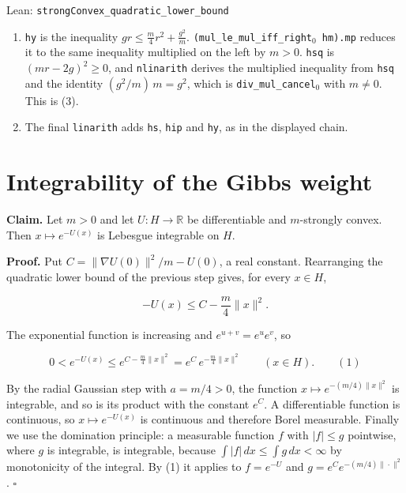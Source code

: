 \documentclass[11pt,a4paper]{article}
\begin{document}
\begin{leanbox}{Lean: \texttt{strongConvex\_\allowbreak{}quadratic\_\allowbreak{}lower\_\allowbreak{}bound}}
\begin{enumerate}
\item \texttt{hy} is the inequality \(gr\le\frac m4r^2+\frac{g^2}m\). \texttt{(mul\_\allowbreak{}le\_\allowbreak{}mul\_\allowbreak{}iff\_\allowbreak{}right\ensuremath{{}_{0}} hm).\allowbreak{}mp} reduces it to the same inequality multiplied on the left by \(m>0\). \texttt{hsq} is \((mr-2g)^2\ge0\), and \texttt{nlinarith} derives the multiplied inequality from \texttt{hsq} and the identity \((g^2/m)\,m=g^2\), which is \texttt{div\_\allowbreak{}mul\_\allowbreak{}cancel\ensuremath{{}_{0}}} with \(m\ne0\). This is (3).

\item The final \texttt{linarith} adds \texttt{hs}, \texttt{hip} and \texttt{hy}, as in the displayed chain.

\end{enumerate}
\end{leanbox}

\section{\texorpdfstring{Integrability of the Gibbs weight}{Integrability of the Gibbs weight}}


\textbf{Claim.} Let \(m>0\) and let \(U:H\to\mathbb R\) be differentiable and \(m\)-strongly convex. Then \(x\mapsto e^{-U(x)}\) is Lebesgue integrable on \(H\).




\textbf{Proof.} Put \(C=\|\nabla U(0)\|^2/m-U(0)\), a real constant. Rearranging the quadratic lower bound of the previous step gives, for every \(x\in H\),


\[-U(x)\le C-\frac m4\|x\|^2.\]


The exponential function is increasing and \(e^{u+v}=e^ue^v\), so


\[0<e^{-U(x)}\le e^{C-\frac m4\|x\|^2}=e^{C}\,e^{-\frac m4\|x\|^2}\qquad(x\in H).\qquad(1)\]


By the radial Gaussian step with \(a=m/4>0\), the function \(x\mapsto e^{-(m/4)\|x\|^2}\) is integrable, and so is its product with the constant \(e^{C}\). A differentiable function is continuous, so \(x\mapsto e^{-U(x)}\) is continuous and therefore Borel measurable. Finally we use the domination principle: a measurable function \(f\) with \(|f|\le g\) pointwise, where \(g\) is integrable, is integrable, because \(\int|f|\,dx\le\int g\,dx<\infty\) by monotonicity of the integral. By (1) it applies to \(f=e^{-U}\) and \(g=e^Ce^{-(m/4)\|\cdot\|^2}\). \(\square\)
\end{document}
